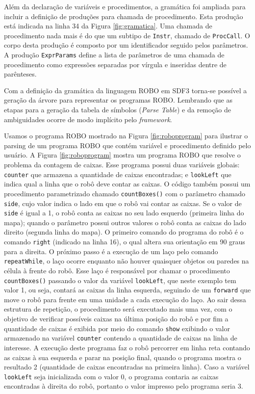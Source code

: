 Além da declaração de variáveis e procedimentos, a gramática foi ampliada para incluir a definição de produções para chamada de procedimento. Esta produção está indicada na linha 34 da Figura \ref{fig:gramatica}. Uma chamada de procedimento nada mais é do que um subtipo de \texttt{Instr}, chamado de \texttt{ProcCall}. O corpo desta produção é composto por um identificador seguido pelos parâmetros. A produção \texttt{ExprParams} define a lista de parâmetros de uma chamada de procedimento como expressões separadas por vírgula e inseridas dentre de parênteses.

Com a definição da gramática da linguagem ROBO em SDF3 torna-se possível a geração da árvore para representar os programas ROBO. Lembrando que as etapas para a geração da tabela de símbolos (\textit{Parse Table}) e da remoção de ambiguidades ocorre de modo implícito pelo \textit{framework}.

Usamos o programa ROBO mostrado na Figura \ref{fig:roboprogram} para ilustrar o parsing de um programa ROBO que contém variável e procedimento definido pelo usuário. A Figura \ref{fig:roboprogram} mostra um programa ROBO que resolve o problema da contagem de caixas. 
Esse programa possui duas variáveis globais: \texttt{counter} que armazena a quantidade de caixas encontradas; e \texttt{lookLeft} que indica qual a linha que o robô deve contar as caixas. O código também possui um procedimento parametrizado chamado \texttt{countBoxes()} com o parâmetro chamado \texttt{side}, cujo valor indica o lado em que o robô vai contar as caixas. Se o valor de \texttt{side} é igual a 1, o robô conta as caixas no seu lado esquerdo (primeira linha do mapa);  quando o parâmetro possui outros valores o robô conta as caixas do lado direito (segunda linha do mapa). O primeiro comando do programa do robô é o comando \texttt{right} (indicado na linha 16), o qual altera sua orientação em 90 graus para a direita. O próximo passo é a execução de um laço pelo comando \texttt{repeatWhile}, o laço ocorre enquanto não houver quaisquer objetos ou paredes na célula à frente do robô. Esse laço é responsável por chamar o procedimento \texttt{countBoxes()} passando o valor da variável \texttt{lookLeft}, que neste exemplo tem valor 1, ou seja, contará as caixas da linha esquerda, seguindo de um \texttt{forward} que move o robô para frente em uma unidade a cada execução do laço. Ao sair dessa estrutura de repetição, o procedimento será executado mais uma vez, com o objetivo de verificar possíveis caixas na última posição do robô e por fim a quantidade de caixas é exibida por meio do comando \texttt{show} exibindo o valor armazenado na variável \texttt{counter} contendo a quantidade de caixas na linha de interesse. 
A execução deste programa faz o robô percorrer em linha reta contando as caixas à sua esquerda e parar na posição final, quando o programa mostra o resultado 2 (quantidade de caixas encontradas na primeira linha). Caso a variável \texttt{lookLeft} seja inicializada com o valor 0, o programa contaria as caixas encontradas à direita do robô, portanto o valor impresso pelo programa seria 3. 

